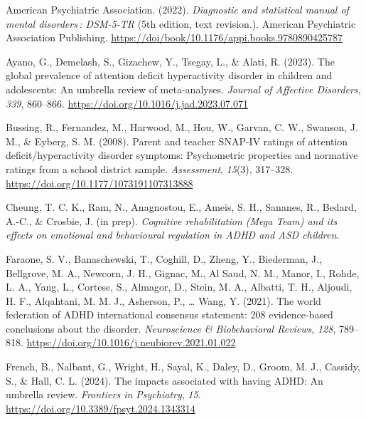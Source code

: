 \documentclass[
  letterpaper,
]{ut-thesis}
\newlength{\cslhangindent}
\newenvironment{CSLReferences}[2] %
 {\begin{list}{}{%
  \setlength{\itemindent}{0pt}
  \setlength{\leftmargin}{0pt}
  \setlength{\parsep}{0pt}
  \ifodd #1
   \setlength{\leftmargin}{\cslhangindent}
   \setlength{\itemindent}{-1\cslhangindent}
  \fi
  \setlength{\itemsep}{#2\baselineskip}}}
 {\end{list}}
\begin{document}

\label{refs}
\begin{CSLReferences}{1}{0}
American Psychiatric Association. (2022). \emph{Diagnostic and
statistical manual of mental disorders : {DSM-5-TR}} (5th edition, text
revision.). American Psychiatric Association Publishing.
\url{https://doi/book/10.1176/appi.books.9780890425787}

Ayano, G., Demelash, S., Gizachew, Y., Tsegay, L., \& Alati, R. (2023).
The global prevalence of attention deficit hyperactivity disorder in
children and adolescents: {An} umbrella review of meta-analyses.
\emph{Journal of Affective Disorders}, \emph{339}, 860--866.
\url{https://doi.org/10.1016/j.jad.2023.07.071}

Bussing, R., Fernandez, M., Harwood, M., Hou, W., Garvan, C. W.,
Swanson, J. M., \& Eyberg, S. M. (2008). Parent and teacher {SNAP-IV}
ratings of attention deficit/hyperactivity disorder symptoms:
{Psychometric} properties and normative ratings from a school district
sample. \emph{Assessment}, \emph{15}(3), 317--328.
\url{https://doi.org/10.1177/1073191107313888}

Cheung, T. C. K., Ram, N., Anagnostou, E., Ameis, S. H., Sananes, R.,
Bedard, A.-C., \& Crosbie, J. (in prep). \emph{Cognitive rehabilitation
({Mega Team}) and its effects on emotional and behavioural regulation in
{ADHD} and {ASD} children}.

Faraone, S. V., Banaschewski, T., Coghill, D., Zheng, Y., Biederman, J.,
Bellgrove, M. A., Newcorn, J. H., Gignac, M., Al Saud, N. M., Manor, I.,
Rohde, L. A., Yang, L., Cortese, S., Almagor, D., Stein, M. A., Albatti,
T. H., Aljoudi, H. F., Alqahtani, M. M. J., Asherson, P., \ldots{} Wang,
Y. (2021). The world federation of {ADHD} international consensus
statement: 208 evidence-based conclusions about the disorder.
\emph{Neuroscience \& Biobehavioral Reviews}, \emph{128}, 789--818.
\url{https://doi.org/10.1016/j.neubiorev.2021.01.022}

French, B., Nalbant, G., Wright, H., Sayal, K., Daley, D., Groom, M. J.,
Cassidy, S., \& Hall, C. L. (2024). The impacts associated with having
{ADHD}: An umbrella review. \emph{Frontiers in Psychiatry}, \emph{15}.
\url{https://doi.org/10.3389/fpsyt.2024.1343314}


\end{CSLReferences}
\end{document}
